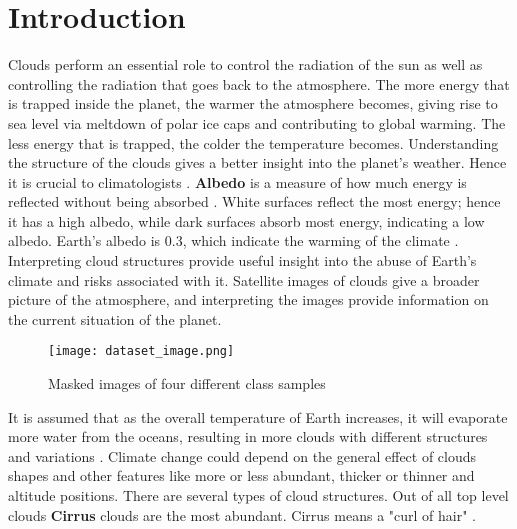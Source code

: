 \documentclass[conference]{IEEEtran}
\begin{document}
\section{Introduction}

Clouds perform an essential role to control the radiation of the sun as well as controlling the radiation that goes back to the atmosphere. The more energy that is trapped inside the planet, the warmer the atmosphere becomes, giving rise to sea level via meltdown of polar ice caps and contributing to global warming. The less energy that is trapped, the colder the temperature becomes. Understanding the structure of the clouds gives a better insight into the planet's weather. Hence it is crucial to climatologists \cite{turner2007thin}. \textbf{Albedo} is a measure of how much energy is reflected without being absorbed \cite{twomey1974pollution}. White surfaces reflect the most energy; hence it has a high albedo, while dark surfaces absorb most energy, indicating a low albedo. Earth's albedo is 0.3, which indicate the warming of the climate \cite{palle2004changes}. Interpreting cloud structures provide useful insight into the abuse of Earth's climate and risks associated with it. Satellite images of clouds give a broader picture of the atmosphere, and interpreting the images provide information on the current situation of the planet.

\begin{figure}[ht!]
    \centering
    \texttt{[image: dataset\_image.png]}
    \caption{Masked images of four different class samples}
    \label{Masked}
\end{figure}

It is assumed that as the overall temperature of Earth increases, it will evaporate more water from the oceans, resulting in more clouds with different structures and variations \cite{leconte2013increased}. Climate change could depend on the general effect of clouds shapes and other features like more or less abundant, thicker or thinner and altitude positions. There are several types of cloud structures. Out of all top level clouds \textbf{Cirrus} clouds are the most abundant. Cirrus means a "curl of hair" \cite{dowling1990summary}.
\end{document}
